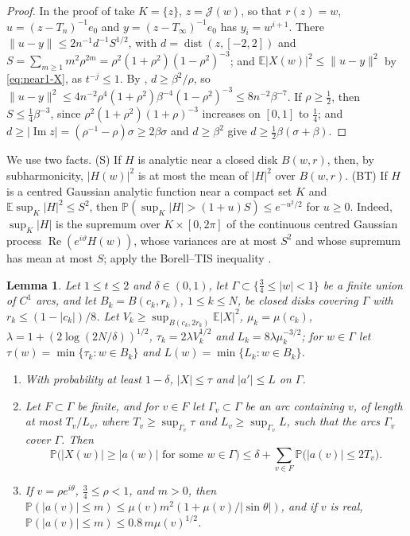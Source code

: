 \documentclass[11pt]{amsart}
\newtheorem{lemma}[theorem]{Lemma}
\theoremstyle{definition}
\theoremstyle{remark}
\numberwithin{equation}{section}
\newcommand{\E}{\mathbb{E}}
\newcommand{\PP}{\mathbb{P}}
\DeclareMathOperator{\re}{Re}
\DeclareMathOperator{\im}{Im}
\DeclareMathOperator{\dist}{dist}
\begin{document}
\begin{proof}
In the proof of \cite[Proposition~\ref{M-prop:exterior}]{Main} take $K=\{z\}$, $z=\mathcal J(w)$, so that $r(z)=w$, $u=(z-T_n)^{-1}e_0$ and $y=(z-T_\infty)^{-1}e_0$ has $y_i=w^{i+1}$. There $\|u-y\|\le2n^{-1}d^{-1}S^{1/2}$, with $d=\dist(z,[-2,2])$ and $S=\sum_{m\ge1}m^2\rho^{2m}=\rho^2(1+\rho^2)(1-\rho^2)^{-3}$; and $\E|X(w)|^2\le\|u-y\|^2$ by \eqref{eq:near1-X}, as $t^{-j}\le1$. By \cite[\eqref{M-eq:joukowski-dist}]{Main}, $d\ge\beta^2/\rho$, so $\|u-y\|^2\le4n^{-2}\rho^4(1+\rho^2)\beta^{-4}(1-\rho^2)^{-3}\le8n^{-2}\beta^{-7}$. If $\rho\ge\frac12$, then $S\le\frac14\beta^{-3}$, since $\rho^2(1+\rho^2)(1+\rho)^{-3}$ increases on $[0,1]$ to $\frac14$; and $d\ge|\im z|=(\rho^{-1}-\rho)\sigma\ge2\beta\sigma$ and $d\ge\beta^2$ give $d\ge\frac12\beta(\sigma+\beta)$.
\end{proof}

We use two facts. (S) If $H$ is analytic near a closed disk $B(w,r)$, then, by subharmonicity, $|H(w)|^2$ is at most the mean of $|H|^2$ over $B(w,r)$. (BT) If $H$ is a centred Gaussian analytic function near a compact set $K$ and $\E\sup_K|H|^2\le S^2$, then $\PP(\sup_K|H|>(1+u)S)\le e^{-u^2/2}$ for $u\ge0$. Indeed, $\sup_K|H|$ is the supremum over $K\times[0,2\pi]$ of the continuous centred Gaussian process $\re(e^{i\vartheta}H(w))$, whose variances are at most $S^2$ and whose supremum has mean at most $S$; apply the Borell--TIS inequality \cite[Theorem~2.1.1]{AT}.

\begin{lemma}\label{lem:near1-net}
Let $1\le t\le2$ and $\delta\in(0,1)$, let $\Gamma\subset\{\frac34\le|w|<1\}$ be a finite union of $C^1$ arcs, and let $B_k=B(c_k,r_k)$, $1\le k\le N$, be closed disks covering $\Gamma$ with $r_k\le(1-|c_k|)/8$. Let $V_k\ge\sup_{B(c_k,2r_k)}\E|X|^2$, $\mu_k=\mu(c_k)$, $\lambda=1+(2\log(2N/\delta))^{1/2}$, $\tau_k=2\lambda V_k^{1/2}$ and $L_k=8\lambda\mu_k^{-3/2}$; for $w\in\Gamma$ let $\tau(w)=\min\{\tau_k:w\in B_k\}$ and $L(w)=\min\{L_k:w\in B_k\}$.
\begin{enumerate}
\item[(a)] With probability at least $1-\delta$, $|X|\le\tau$ and $|a'|\le L$ on $\Gamma$.
\item[(b)] Let $F\subset\Gamma$ be finite, and for $v\in F$ let $\Gamma_v\subset\Gamma$ be an arc containing $v$, of length at most $T_v/L_v$, where $T_v\ge\sup_{\Gamma_v}\tau$ and $L_v\ge\sup_{\Gamma_v}L$, such that the arcs $\Gamma_v$ cover $\Gamma$. Then
\[
\PP\bigl(|X(w)|\ge|a(w)|\text{ for some }w\in\Gamma\bigr)\le\delta+\sum_{v\in F}\PP\bigl(|a(v)|\le2T_v\bigr).
\]
\item[(c)] If $v=\rho e^{i\theta}$, $\frac34\le\rho<1$, and $m>0$, then $\PP(|a(v)|\le m)\le\mu(v)m^2(1+\mu(v)/|\sin\theta|)$, and if $v$ is real, $\PP(|a(v)|\le m)\le0.8\,m\mu(v)^{1/2}$.
\end{enumerate}
\end{lemma}
\end{document}
